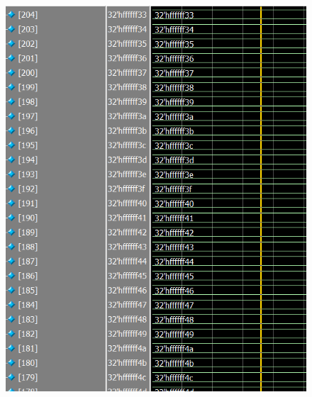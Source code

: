 \documentclass[conference]{IEEEtran}
\begin{document}
	\begin{figure}[H]
		\centering
		\includegraphics[width=\columnwidth]{Files/full_mem_val2}
		\caption{}
		\label{fig:fullmemval2}
	\end{figure}
	
\end{document}
